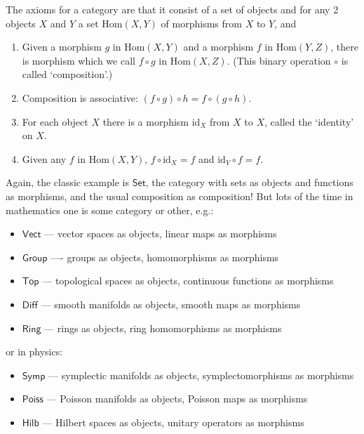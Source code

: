 \documentclass{article}
\def\tightlist{}
\begin{document}
The axioms for a category are that it consist of a set of objects and
for any 2 objects \(X\) and \(Y\) a set \(\mathrm{Hom}(X,Y)\) of
morphisms from \(X\) to \(Y\), and

\begin{enumerate}
\def\labelenumi{\alph{enumi})}
\item
  Given a morphism \(g\) in \(\mathrm{Hom}(X,Y)\) and a morphism \(f\)
  in \(\mathrm{Hom}(Y,Z)\), there is morphism which we call \(f\circ g\)
  in \(\mathrm{Hom}(X,Z)\). (This binary operation \(\circ\) is called
  `composition'.)
\item
  Composition is associative: \((f\circ g)\circ h = f\circ (g\circ h)\).
\item
  For each object \(X\) there is a morphism \(\mathrm{id}_X\) from \(X\)
  to \(X\), called the `identity' on \(X\).
\item
  Given any \(f\) in \(\mathrm{Hom}(X,Y)\),
  \(f \circ \mathrm{id}_X = f\) and \(\mathrm{id}_Y \circ f = f\).
\end{enumerate}

Again, the classic example is \(\mathsf{Set}\), the category with sets
as objects and functions as morphisms, and the usual composition as
composition! But lots of the time in mathematics one is some category or
other, e.g.:

\begin{itemize}
\tightlist
\item
  \(\mathsf{Vect}\) --- vector spaces as objects, linear maps as
  morphisms
\item
  \(\mathsf{Group}\) ---- groups as objects, homomorphisms as morphisms
\item
  \(\mathsf{Top}\) --- topological spaces as objects, continuous
  functions as morphisms
\item
  \(\mathsf{Diff}\) --- smooth manifolds as objects, smooth maps as
  morphisms
\item
  \(\mathsf{Ring}\) --- rings as objects, ring homomorphisms as
  morphisms
\end{itemize}

or in physics:

\begin{itemize}
\tightlist
\item
  \(\mathsf{Symp}\) --- symplectic manifolds as objects,
  symplectomorphisms as morphisms
\item
  \(\mathsf{Poiss}\) --- Poisson manifolds as objects, Poisson maps as
  morphisms
\item
  \(\mathsf{Hilb}\) --- Hilbert spaces as objects, unitary operators as
  morphisms
\end{itemize}
\end{document}
